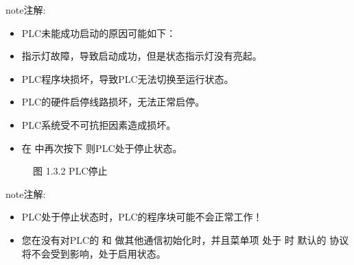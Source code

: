 \documentclass[a4paper,10pt,english]{sphinxmanual}
\begin{document}
\begin{sphinxadmonition}{note}{注解:}\begin{itemize}
\item {} 
\sphinxAtStartPar
PLC未能成功启动的原因可能如下：

\item {} 
\sphinxAtStartPar
{} 指示灯故障，导致启动成功，但是状态指示灯没有亮起。

\item {} 
\sphinxAtStartPar
PLC程序块损坏，导致PLC无法切换至运行状态。

\item {} 
\sphinxAtStartPar
PLC的硬件启停线路损坏，无法正常启停。

\item {} 
\sphinxAtStartPar
PLC系统受不可抗拒因素造成损坏。

\end{itemize}
\end{sphinxadmonition}
\begin{itemize}
\item {} 
\sphinxAtStartPar
在  中再次按下  则PLC处于停止状态。

\end{itemize}

\begin{figure}[htbp]
\centering
\capstart

\noindent{}
\caption{图 1.3.2 PLC停止}\label{\detokenize{operation_guide:id9}}\end{figure}

\begin{sphinxadmonition}{note}{注解:}\begin{itemize}
\item {} 
\sphinxAtStartPar
PLC处于停止状态时，PLC的程序块可能不会正常工作！

\item {} 
\sphinxAtStartPar
您在没有对PLC的  和  做其他通信初始化时，并且菜单项  处于  时
默认的  协议将不会受到影响，处于启用状态。

\end{itemize}
\end{sphinxadmonition}

\sphinxAtStartPar
{}
\end{document}
